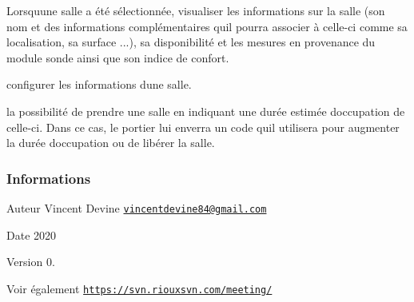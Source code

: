 \begin{DoxyItemize}
\item Lorsqu\textquotesingle{}une salle a été sélectionnée, visualiser les informations sur la salle (son nom et des informations complémentaires qu\textquotesingle{}il pourra associer à celle-\/ci comme sa localisation, sa surface ...), sa disponibilité et les mesures en provenance du module sonde ainsi que son indice de confort.
\item configurer les informations d\textquotesingle{}une salle.
\item la possibilité de prendre une salle en indiquant une durée estimée d\textquotesingle{}occupation de celle-\/ci. Dans ce cas, le portier lui enverra un code qu\textquotesingle{}il utilisera pour augmenter la durée d\textquotesingle{}occupation ou de libérer la salle.
\end{DoxyItemize}\hypertarget{page__r_e_a_d_m_e_informations}{}\subsubsection{Informations}\label{page__r_e_a_d_m_e_informations}
\begin{DoxyAuthor}{Auteur}
Vincent Devine \href{mailto:vincentdevine84@gmail.com}{\tt vincentdevine84@gmail.\+com} 
\end{DoxyAuthor}
\begin{DoxyDate}{Date}
2020 
\end{DoxyDate}
\begin{DoxyVersion}{Version}
0. 
\end{DoxyVersion}
\begin{DoxySeeAlso}{Voir également}
\href{https://svn.riouxsvn.com/meeting/}{\tt https\+://svn.\+riouxsvn.\+com/meeting/} 
\end{DoxySeeAlso}
